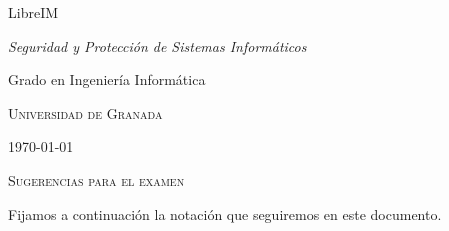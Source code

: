 \documentclass[
  a4paper,
  spanish,
  12pt,
]{scrartcl}
\theoremstyle{ejercicio-style}
\theoremstyle{remark-style}
\theoremstyle{teorema-style}
\begin{document}
\begin{flushright}
  LibreIM\vspace{.5em}

  \textit{Seguridad y Protección de Sistemas Informáticos}

  Grado en Ingeniería Informática

  \textsc{Universidad de Granada}\vspace{.5em}

  \today\vspace{.5em}
\end{flushright}

\begin{flushleft}
  \scshape\LARGE Sugerencias para el examen
\end{flushleft}

\noindent Fijamos a continuación la notación que seguiremos en este documento.
\end{document}
